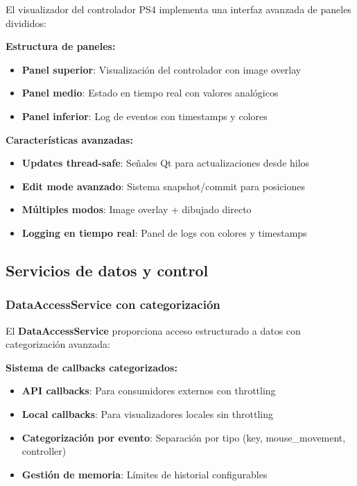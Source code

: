 El visualizador del controlador PS4 implementa una interfaz avanzada de paneles divididos:

\textbf{Estructura de paneles:}
\begin{itemize}
    \item \textbf{Panel superior}: Visualización del controlador con image overlay
    \item \textbf{Panel medio}: Estado en tiempo real con valores analógicos
    \item \textbf{Panel inferior}: Log de eventos con timestamps y colores
\end{itemize}

\textbf{Características avanzadas:}
\begin{itemize}
    \item \textbf{Updates thread-safe}: Señales Qt para actualizaciones desde hilos
    \item \textbf{Edit mode avanzado}: Sistema snapshot/commit para posiciones
    \item \textbf{Múltiples modos}: Image overlay + dibujado directo
    \item \textbf{Logging en tiempo real}: Panel de logs con colores y timestamps
\end{itemize}

\subsection{Servicios de datos y control}
\label{subsec:servicios_input_collector}

\subsubsection{DataAccessService con categorización}

El \textbf{DataAccessService} proporciona acceso estructurado a datos con categorización avanzada:

\textbf{Sistema de callbacks categorizados:}
\begin{itemize}
    \item \textbf{API callbacks}: Para consumidores externos con throttling
    \item \textbf{Local callbacks}: Para visualizadores locales sin throttling
    \item \textbf{Categorización por evento}: Separación por tipo (key, mouse\_movement, controller)
    \item \textbf{Gestión de memoria}: Límites de historial configurables
\end{itemize}


